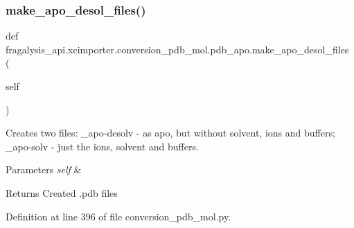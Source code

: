 \subsubsection{\texorpdfstring{make\+\_\+apo\+\_\+desol\+\_\+files()}{make\_apo\_desol\_files()}}
{\footnotesize\ttfamily def fragalysis\+\_\+api.\+xcimporter.\+conversion\+\_\+pdb\+\_\+mol.\+pdb\+\_\+apo.\+make\+\_\+apo\+\_\+desol\+\_\+files (\begin{DoxyParamCaption}\item[{}]{self }\end{DoxyParamCaption})}



Creates two files\+: \+\_\+apo-\/desolv -\/ as apo, but without solvent, ions and buffers; \+\_\+apo-\/solv -\/ just the ions, solvent and buffers. 


\begin{DoxyParams}{Parameters}
{\em self} & \\
\hline
\end{DoxyParams}
\begin{DoxyReturn}{Returns}
Created .pdb files 
\end{DoxyReturn}


Definition at line 396 of file conversion\+\_\+pdb\+\_\+mol.\+py.


